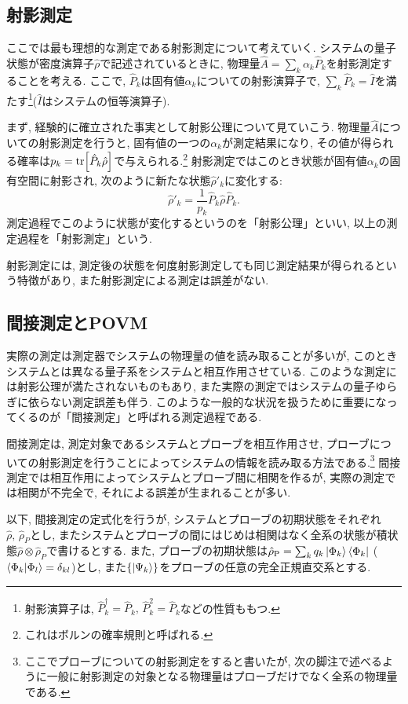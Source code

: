 \subsection{射影測定}
ここでは最も理想的な測定である射影測定について考えていく. システムの量子状態が密度演算子$\hat{\rho}$で記述されているときに, 物理量\(\hat{A}=\sum_{k}\alpha_{k}\hat{P}_{k}\)を射影測定することを考える. ここで, \(\hat{P}_k\)は固有値\(\alpha_k\)についての射影演算子で, \(\sum_k\hat{P}_k=\hat{I}\)を満たす\footnote{射影演算子は, \(\hat{P}_k^\dag=\hat{P}_k,\,\hat{P}_k^2=\hat{P}_k\)などの性質ももつ.}(\(\hat{I}\)はシステムの恒等演算子).  

まず, 経験的に確立された事実として射影公理について見ていこう. 物理量\(\hat{A}\)についての射影測定を行うと, 固有値の一つの\(\alpha_k\)が測定結果になり, その値が得られる確率は\(p_k=\tr[\hat{P}_k\hat{\rho}]\)で与えられる.\footnote{これはボルンの確率規則と呼ばれる.} 射影測定ではこのとき状態が固有値\(\alpha_k\)の固有空間に射影され, 次のように新たな状態\(\hat{\rho}'_k\)に変化する:
\begin{equation}
  \hat{\rho}'_k=\frac{1}{p_k}\hat{P}_k\hat{\rho}\hat{P}_k.
\end{equation}
測定過程でこのように状態が変化するというのを「射影公理」といい, 以上の測定過程を「射影測定」という. 

射影測定には, 測定後の状態を何度射影測定しても同じ測定結果が得られるという特徴があり, また射影測定による測定は誤差がない. 

\subsection{間接測定とPOVM}
実際の測定は測定器でシステムの物理量の値を読み取ることが多いが, このときシステムとは異なる量子系をシステムと相互作用させている. このような測定には射影公理が満たされないものもあり, また実際の測定ではシステムの量子ゆらぎに依らない測定誤差も伴う. このような一般的な状況を扱うために重要になってくるのが「間接測定」と呼ばれる測定過程である. 

間接測定は, 測定対象であるシステムとプローブを相互作用させ, プローブについての射影測定を行うことによってシステムの情報を読み取る方法である.\footnote{ここでプローブについての射影測定をすると書いたが, 次の脚注で述べるように一般に射影測定の対象となる物理量はプローブだけでなく全系の物理量である. 
} 間接測定では相互作用によってシステムとプローブ間に相関を作るが, 実際の測定では相関が不完全で, それによる誤差が生まれることが多い. 

以下, 間接測定の定式化を行うが, システムとプローブの初期状態をそれぞれ\(\hat{\rho},\,\hat{\rho}_{\si{P}}\)とし, またシステムとプローブの間にはじめは相関はなく全系の状態が積状態\(\hat{\rho}\otimes\hat{\rho}_P\)で書けるとする. また, プローブの初期状態は\(\hat{\rho}_{\si{P}}=\sum_kq_k\ket{\Phi_k}\bra{\Phi_k}\) (\(\braket{\Phi_k}{\Phi_l}=\delta_{kl}\))とし, また\(\{\ket{\Psi_k}\}\)をプローブの任意の完全正規直交系とする. 


